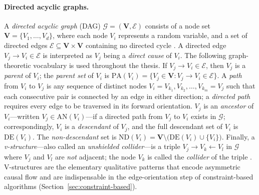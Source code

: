 \paragraph{Directed acyclic graphs.}
A \emph{directed acyclic graph} (DAG) $\mathcal{G} = (\mathbf{V}, \mathcal{E})$
consists of a node set $\mathbf{V} = \{V_1, \ldots, V_d\}$, where each node $V_i$ represents a random variable, and a set of directed edges $\mathcal{E} \subseteq \mathbf{V} \times \mathbf{V}$ containing no directed cycle \cite{Pearl_2009, Spirtes2001CausationPA}.
A directed edge $V_j \to V_i \in \mathcal{E}$ is interpreted as $V_j$
being a \emph{direct cause} of $V_i$. The following graph-theoretic vocabulary is used throughout the thesis.
If $V_j \to V_i \in \mathcal{E}$, then $V_j$ is a \emph{parent} of $V_i$; the \emph{parent set} of $V_i$ is $\mathrm{PA}(V_i) = \{V_j \in \mathbf{V} : V_j \to V_i \in \mathcal{E}\}$.
A \emph{path} from $V_i$ to $V_j$ is any sequence of distinct nodes $V_i = V_{k_1}, V_{k_2}, \ldots, V_{k_m} = V_j$ such that each consecutive pair is connected by an edge in either direction; a \emph{directed path} requires every edge to be traversed in its forward orientation.
$V_j$ is an \emph{ancestor} of $V_i$---written $V_j \in \mathrm{AN}(V_i)$---if a directed path from $V_j$ to $V_i$ exists in $\mathcal{G}$; correspondingly, $V_i$ is a \emph{descendant} of $V_j$, and the full descendant set of $V_i$ is $\mathrm{DE}(V_i)$.
The \emph{non-descendant} set is $\mathrm{ND}(V_i) = \mathbf{V} \setminus \bigl(\mathrm{DE}(V_i) \cup \{V_i\}\bigr)$.
Finally, a \emph{v-structure}---also called an \emph{unshielded collider}---is a triple $V_j \to V_k \leftarrow V_l$ in $\mathcal{G}$ where $V_j$ and $V_l$ are \emph{not} adjacent; the node $V_k$ is called the \emph{collider} of the triple \cite{Spirtes2001CausationPA}.
V-structures are the elementary qualitative patterns that encode asymmetric causal flow and are indispensable in the edge-orientation step of constraint-based algorithms (Section~\ref{sec:constraint-based}).

